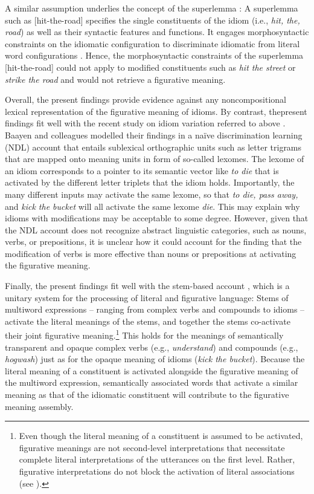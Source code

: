 \documentclass[output=paper]{langsci/langscibook}
\begin{document}
A similar assumption underlies the concept of the superlemma \citep{sprenger:2006}: A superlemma such as [hit-the-road] specifies the single constituents of the idiom (i.e., \textit{hit, the, road}) as well as their syntactic features and functions. It engages morphosyntactic constraints on the idiomatic configuration to discriminate idiomatic from literal word configurations \citep{sprenger:2006}. Hence, the morphosyntactic constraints of the superlemma [hit-the-road] could not apply to modified constituents such as \textit{hit the street} or \textit{strike the road} and would not retrieve a figurative meaning. 


Overall, the present findings provide evidence against any noncompositional lexical representation of the figurative meaning of idioms. By contrast, the\linebreak present findings fit well with the recent study on idiom variation referred to above \citep{geeraert:2017}. Baayen and colleagues modelled their findings in a naïve discrimination learning (NDL) account \citep{baayen:2013,baayen:2011,baayen:2016} that entails sublexical orthographic units such as letter trigrams that are mapped onto meaning units in form of so-called lexomes. The lexome of an idiom corresponds to a pointer to its semantic vector like \textit{to die} that is activated by the different letter triplets that the idiom holds. Importantly, the many different inputs may activate the same lexome, so that \textit{to die, pass away,} and \textit{kick the bucket} will all activate the same lexome \textit{die}. This may explain why idioms with modifications may be acceptable to some degree. However, given that the NDL account does not recognize abstract linguistic categories, such as nouns, verbs, or prepositions, it is unclear how it could account for the finding that the modification of verbs is more effective than nouns or prepositions at activating the figurative meaning.\largerpage[2]

Finally, the present findings fit well with the stem-based account \citep{gunther:2018,rabanus:2008,smolka:2017,smolka:2007,smolka:2014,smolka:2015,smolka:2018}, which is a unitary system for the processing of literal and figurative language: Stems of multiword expressions -- ranging from complex verbs and compounds to idioms -- activate the literal meanings of the stems, and together the stems co-activate their joint figurative meaning.{\footnote{Even though the literal meaning of a constituent is assumed to be activated, figurative meanings are not second-level interpretations that necessitate complete literal interpretations of the utterances on the first level. Rather, figurative interpretations do not block the activation of literal associations (see \citealt{gibbs:2002}).}} This holds for the meanings of semantically transparent and opaque complex verbs (e.g., \textit{understand}) and compounds (e.g., \textit{hogwash}) just as for the opaque meaning of idioms (\textit{kick the bucket}). Because the literal meaning of a constituent is activated alongside the figurative meaning of the multiword expression, semantically associated words that activate a similar meaning as that of the idiomatic constituent will contribute to the figurative meaning assembly. 
\end{document}
